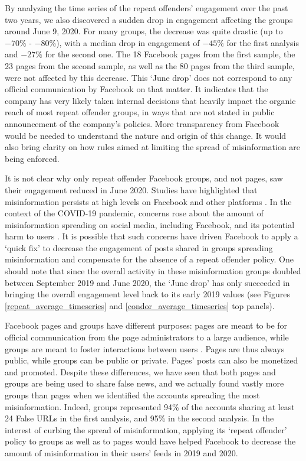 \documentclass[review]{elsarticle}
\begin{document}
{{By analyzing the time series of the repeat offenders’ engagement over the past two years, we also discovered a sudden drop in engagement affecting the groups around June 9, 2020.
For many groups, the decrease was quite drastic (up to $-70\%$ - $-80\%$), with a median drop in engagement of $-45\%$ for the first analysis and $-27\%$ for the second one.
The 18 Facebook pages from the first sample, the 23 pages from the second sample, as well as the 80 pages from the third sample, were not affected by this decrease.
This `June drop' does not correspond to any official communication by Facebook on that matter. 
It indicates that the company has very likely taken internal decisions that heavily impact the organic reach of most repeat offender groups, in ways that are not stated in public announcement of the company's policies.
More transparency from Facebook would be needed to understand the nature and origin of this change. 
It would also bring clarity on how rules aimed at limiting the spread of misinformation are being enforced.

It is not clear why only repeat offender Facebook groups, and not pages, saw their engagement reduced in June 2020.
Studies have highlighted that misinformation persists at high levels on Facebook and other platforms \citep{kornbluh2020new, resnick2018iffy}.
In the context of the COVID-19 pandemic, concerns rose about the amount of misinformation spreading on social media, including Facebook, and its potential harm to users \citep{johnson2020online}.
It is possible that such concerns have driven Facebook to apply a `quick fix' to decrease the engagement of posts shared in groups spreading misinformation and compensate for the absence of a repeat offender policy.
One should note that since the overall activity in these misinformation groups doubled between September 2019 and June 2020, the `June drop' has only succeeded in bringing the overall engagement level back to its early 2019 values (see Figures \ref{repeat_average_timeseries} and \ref{condor_average_timeseries} top panels).

Facebook pages and groups have different purposes: pages are meant to be for official communication from the page administrators to a large audience, while groups are meant to foster interactions between users \citep{differenceGroupAndPage}. 
Pages are thus always public, while groups can be public or private.
Pages' posts can also be monetized and promoted.
Despite these differences, we have seen that both pages and groups are being used to share false news, and we actually found vastly more groups than pages when we identified the accounts spreading the most misinformation.
Indeed, groups represented 94\% of the accounts sharing at least 24 False URLs in the first analysis, and 95\% in the second analysis.
In the interest of curbing the spread of misinformation, applying its `repeat offender' policy to groups as well as to pages would have helped Facebook to decrease the amount of misinformation in their users’ feeds in 2019 and 2020.

}}
\end{document}
